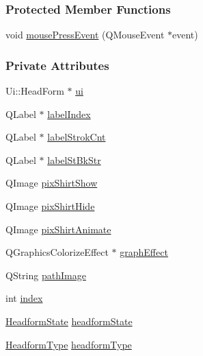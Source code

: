 \subsubsection*{Protected Member Functions}
\begin{DoxyCompactItemize}
\item 
void \mbox{\hyperlink{classHeadForm_a922c24b7eb4d084712d0ec4e9a084e90}{mouse\+Press\+Event}} (Q\+Mouse\+Event $\ast$event)
\end{DoxyCompactItemize}
\subsubsection*{Private Attributes}
\begin{DoxyCompactItemize}
\item 
Ui\+::\+Head\+Form $\ast$ \mbox{\hyperlink{classHeadForm_afd952edd2f6b6e9ccd02f18ddf694ad1}{ui}}
\item 
Q\+Label $\ast$ \mbox{\hyperlink{classHeadForm_adbc068754f789e1a63c113f1ce7caf38}{label\+Index}}
\item 
Q\+Label $\ast$ \mbox{\hyperlink{classHeadForm_a591efe6e830fd170cb549bca142d2759}{label\+Strok\+Cnt}}
\item 
Q\+Label $\ast$ \mbox{\hyperlink{classHeadForm_a1a7f706cff05b5644d3eae9ab21b2caf}{label\+St\+Bk\+Str}}
\item 
Q\+Image \mbox{\hyperlink{classHeadForm_a30f30561d242211ed827ffaf627e0839}{pix\+Shirt\+Show}}
\item 
Q\+Image \mbox{\hyperlink{classHeadForm_a54d7609f912aa7b0edd6850e1f57f0a0}{pix\+Shirt\+Hide}}
\item 
Q\+Image \mbox{\hyperlink{classHeadForm_aa44a452750fe6db786814ec502f0d655}{pix\+Shirt\+Animate}}
\item 
Q\+Graphics\+Colorize\+Effect $\ast$ \mbox{\hyperlink{classHeadForm_a65805e9d52c18a00fd2bece0f560f26a}{graph\+Effect}}
\item 
Q\+String \mbox{\hyperlink{classHeadForm_a88124373bcbdb5679ea11608362e485b}{path\+Image}}
\item 
int \mbox{\hyperlink{classHeadForm_a5e01a73f3b47bdc85ea85f5650cdf0d0}{index}}
\item 
\mbox{\hyperlink{classHeadForm_ae7f8ba0c9db5a5140ac4e3417dc1d9b2}{Headform\+State}} \mbox{\hyperlink{classHeadForm_a0ffd2cf8eea50202d72c4bf286a11916}{headform\+State}}
\item 
\mbox{\hyperlink{classHeadForm_a15bfe98cd74c9677947211a02313f7d1}{Headform\+Type}} \mbox{\hyperlink{classHeadForm_a5f448e8b1081f12332f699d029fa8433}{headform\+Type}}

\end{DoxyCompactItemize}
